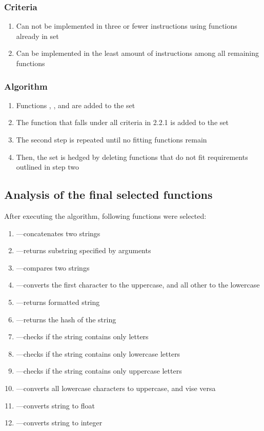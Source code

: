 \documentclass[11pt,nonacm,natbib=false]{acmart}
\begin{document}
\subsubsection{Criteria}
\begin{enumerate}
    \item Can not be implemented in three or fewer instructions using functions already in set
    \item Can be implemented in the least amount of instructions among all remaining functions
\end{enumerate}
\subsubsection{Algorithm}
\begin{enumerate}
    \item Functions , , and  are added to the set
    \item The function that falls under all criteria in 2.2.1 is added to the set
    \item The second step is repeated until no fitting functions remain
    \item Then, the set is hedged by deleting functions that do not fit requirements outlined in step two
\end{enumerate}
\subsection{Analysis of the final selected functions}
After executing the algorithm, following functions were selected:
\begin{enumerate}
    \item {}---concatenates two strings
    \item {}---returns substring specified by arguments
    \item {}---compares two strings
    \item {}---converts the first character to the uppercase, and all other to the lowercase
    \item {}---returns formatted string
    \item {}---returns the hash of the string
    \item {}---checks if the string contains only letters
    \item {}---checks if the string contains only lowercase letters
    \item {}---checks if the string contains only uppercase letters
    \item {}---converts all lowercase characters to uppercase, and vise versa
    \item {}---converts string to float
    \item {}---converts string to integer
\end{enumerate}
\end{document}
